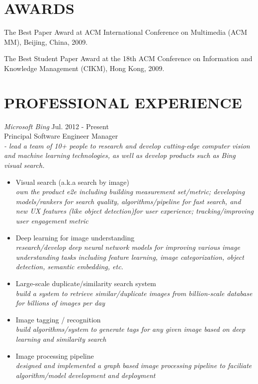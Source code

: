 \documentclass{res}
\begin{document}
\begin{resume}

\section{AWARDS}

The Best Paper Award at ACM International Conference on Multimedia (ACM MM), Beijing, China, 2009.

The Best Student Paper Award at the 18th ACM Conference on Information and Knowledge Management (CIKM), Hong Kong, 2009.




\section{{PROFESSIONAL EXPERIENCE}}
{\sl Microsoft Bing} \hfill        Jul. 2012 - Present \\
Principal Software Engineer Manager \\
\emph{ - lead a team of 10+ people to research and develop cutting-edge computer vision and machine learning technologies, as well as develop products such as Bing visual search.}
    \begin{itemize} \itemsep 1pt %
   	\item Visual search (a.k.a search by image) \\
   	\emph{own the product e2e including building measurement set/metric; developing models/rankers for search quality, algorithms/pipeline for fast search, and new UX features (like object detection)for user experience; tracking/improving user engagement metric}
   	
    \item Deep learning for image understanding \\
    \emph{research/develop deep neural network models for improving various image understanding tasks including feature learning, image categorization, object detection, semantic embedding, etc.}
    
    \item Large-scale duplicate/similarity search system \\
    \emph{build a system to retrieve similar/duplicate images from billion-scale database for billions of images per day}
    \item Image tagging / recognition \\
    \emph{build algorithms/system to generate tags for any given image based on deep learning and similarity search}
    \item {Image processing pipeline} \\
    \emph{designed and implemented a graph based image processing pipeline to faciliate algorithm/model development and deployment}
    \end{itemize}


\end{resume}
\end{document}
